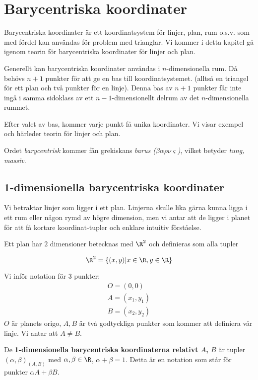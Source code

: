 
\section{Barycentriska koordinater}
\label{sec:bary-intro}
Barycentriska koordinater är ett koordinatsystem för linjer, plan, rum o.s.v. som med fördel kan användas
för problem med trianglar. Vi kommer i detta kapitel gå igenom teorin för barycentriska koordinater
för linjer och plan.

Generellt kan barycentriska koordinater användas i $n$-dimensionella rum.
Då behövs $n+1$ punkter för att ge en bas till koordinatsystemet.
(alltså en triangel för ett plan och två punkter för en linje).
Denna bas av $n+1$ punkter får inte ingå i samma sidoklass av ett $n-1$-dimensionellt delrum
av det $n$-dimensionella rummet.

Efter valet av bas, kommer varje punkt få unika koordinater.
Vi visar exempel och härleder teorin för linjer och plan.


Ordet \textit{barycentrisk} kommer fån 
    grekiskans \textit{barus ($\beta\alpha\rho\nu\varsigma$)},
vilket betyder \textit{tung, massiv}.


\subsection{1-dimensionella barycentriska koordinater}
Vi betraktar linjer som ligger i ett plan. Linjerna skulle
lika gärna kunna ligga i ett rum eller någon rymd av högre dimension,
men vi antar att de ligger i planet för att få kortare koordinat-tupler
och enklare intuitiv förståelse.


Ett plan har $2$ dimensioner betecknas med $\R^2$ och 
definieras som alla tupler

\[\R^2 = \{ (x,y) | x \in \R, y \in \R \}\]

Vi inför notation för $3$ punkter:
\begin{eqnarray*}
O = (0, 0) \\
A = (x_1, y_1) \\
B = (x_2, y_2)
\end{eqnarray*}
$O$ är planets origo, $A, B$ är två godtyckliga punkter som kommer att definiera vår linje.
Vi antar att $A\neq B$.


\begin{Definition}\label{def:dim-1-bary-koord}
De \textbf{1-dimensionella barycentriska koordinaterna relativt $A$, $B$} är tupler 
$(\alpha, \beta)_{(A, B)}$ med $\alpha, \beta \in \R$, $\alpha + \beta = 1$.
Detta är en notation som står för punkter $\alpha A + \beta B$.
\end{Definition}

